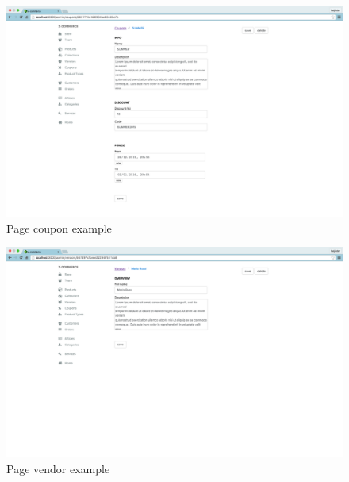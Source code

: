 \begin{figure}[htb]
\centering
\includegraphics[width=1.0\linewidth]{images/chapter4/page-coupon-all.png}\hfill
\caption[page coupon example]{Page coupon example}
\label{fig:design_page}
\end{figure}
\begin{figure}[htb]
\centering
\includegraphics[width=1.0\linewidth]{images/chapter4/page-vendor-all.png}\hfill
\caption[page vendor example]{Page vendor example}
\label{fig:design_page}
\end{figure}